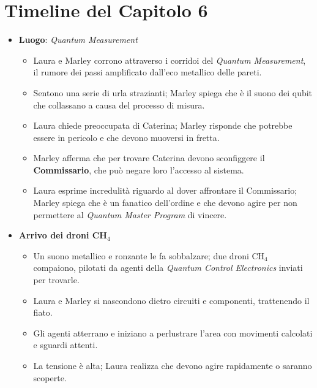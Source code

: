
\section*{Timeline del Capitolo 6}

\begin{itemize}
    \item \textbf{Luogo}: \emph{Quantum Measurement}
    \begin{itemize}
        \item Laura e Marley corrono attraverso i corridoi del \emph{Quantum Measurement}, il rumore dei passi amplificato dall'eco metallico delle pareti.
        \item Sentono una serie di urla strazianti; Marley spiega che è il suono dei qubit che collassano a causa del processo di misura.
        \item Laura chiede preoccupata di Caterina; Marley risponde che potrebbe essere in pericolo e che devono muoversi in fretta.
        \item Marley afferma che per trovare Caterina devono sconfiggere il \textbf{Commissario}, che può negare loro l'accesso al sistema.
        \item Laura esprime incredulità riguardo al dover affrontare il Commissario; Marley spiega che è un fanatico dell'ordine e che devono agire per non permettere al \emph{Quantum Master Program} di vincere.
    \end{itemize}
\end{itemize}


\begin{itemize}
    \item \textbf{Arrivo dei droni CH$_4$}
    \begin{itemize}
        \item Un suono metallico e ronzante le fa sobbalzare; due droni CH$_4$ compaiono, pilotati da agenti della \emph{Quantum Control Electronics} inviati per trovarle.
        \item Laura e Marley si nascondono dietro circuiti e componenti, trattenendo il fiato.
        \item Gli agenti atterrano e iniziano a perlustrare l'area con movimenti calcolati e sguardi attenti.
        \item La tensione è alta; Laura realizza che devono agire rapidamente o saranno scoperte.
    \end{itemize}
\end{itemize}


